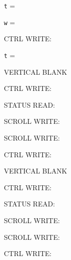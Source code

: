 \texttt{t} = 

\texttt{w} = 

CTRL WRITE: 

\texttt{t} = 

VERTICAL BLANK

CTRL WRITE: 

STATUS READ: 

SCROLL WRITE: 

SCROLL WRITE: 

CTRL WRITE: 

VERTICAL BLANK

CTRL WRITE: 

STATUS READ: 

SCROLL WRITE: 

SCROLL WRITE: 

CTRL WRITE: 
